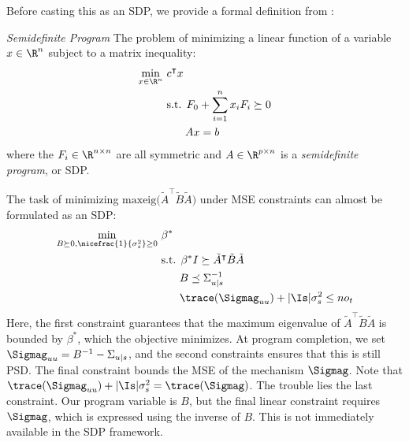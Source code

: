 Before casting this as an SDP, we provide a formal definition from \cite{SDPs}: 

\begin{definition}\emph{Semidefinite Program} 
	\label{def: SDP}
	The problem of minimizing a linear function of a variable $x \in \R^n$ subject to a matrix inequality: 
	\begin{align*}
		\min_{x \in \R^n} \ &c^\intercal x \\
		&\text{s.t. } F_0 + \sum_{i=1}^n x_i F_i \succeq 0 \\
		& \quad \ \  Ax = b
	\end{align*}
	where the $F_i \in \R^{n \times n}$ are all symmetric and $A \in \R^{p \times n}$ is a \emph{semidefinite program}, or SDP. 
\end{definition}

The task of minimizing $\text{maxeig} \big( \tilde{A}^\intercal \tilde{B} \tilde{A} \big)$ under MSE constraints can almost be formulated as an SDP: 
\begin{align*}
	\min_{B \succeq 0 , \nicefrac{1}{\sigma_s^2} \geq 0} \ &\beta^* \\
	&\text{s.t. } \beta^* I  \succeq \tilde{A}^\intercal \tilde{B} \tilde{A} \\
	& \quad \ \ B \preceq \Sigma_{u|s}^{-1} \\
	&\quad \ \ \trace(\Sigmag_{uu}) + |\Is| \sigma_s^2 \leq n o_t 
\end{align*}
Here, the first constraint guarantees that the maximum eigenvalue of $\tilde{A}^\intercal \tilde{B} \tilde{A}$ is bounded by $\beta^*$, which the objective minimizes. At program completion, we set $\Sigmag_{uu} = B^{-1} - \Sigma_{u|s}$, and the second constraints ensures that this is still PSD. The final constraint bounds the MSE of the mechanism $\Sigmag$. Note that $\trace(\Sigmag_{uu}) + |\Is| \sigma_s^2 = \trace(\Sigmag)$. The trouble lies the last constraint. Our program variable is $B$, but the final linear constraint requires $\Sigmag$, which is expressed using the inverse of $B$. This is not immediately available in the SDP framework. 

